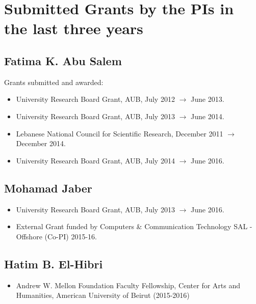 \section{Submitted Grants by the PIs in the last three years}

\subsection{Fatima K. Abu Salem}

Grants submitted and awarded:

\begin{itemize}
\item{University Research Board Grant, AUB, July 2012 $\rightarrow$ June 2013.}
\item{University Research Board Grant, AUB, July 2013 $\rightarrow$ June 2014.}
\item{Lebanese National Council for Scientific Research, December 2011 $\rightarrow$ December 2014.}
\item{University Research Board Grant, AUB, July 2014 $\rightarrow$ June 2016.}
\end{itemize}

\subsection{Mohamad Jaber}
\begin{itemize}
\item{University Research Board Grant, AUB, July 2013 $\rightarrow$ June 2016.}
\item{External Grant funded by Computers \& Communication Technology SAL - Offshore (Co-PI) 2015-16.}
\end{itemize}

\subsection{Hatim B. El-Hibri}

\begin{itemize}
\item{Andrew W. Mellon Foundation Faculty Fellowship, Center for Arts and Humanities, American
University of Beirut (2015-2016)}
\end{itemize}
